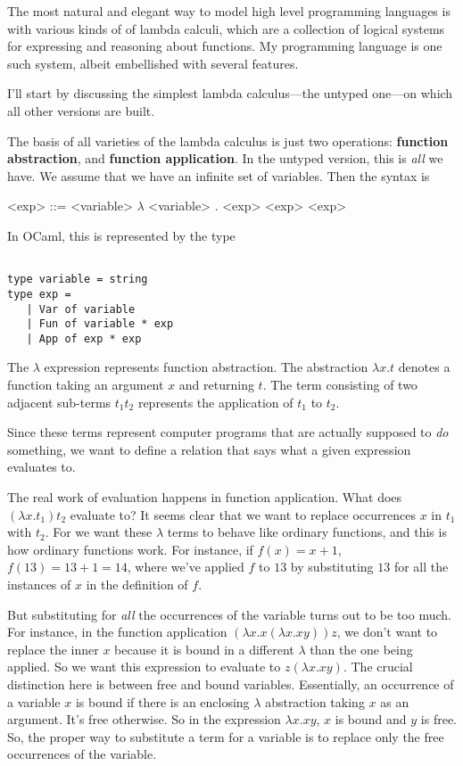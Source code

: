 \message{ !name(report.tex)}\documentclass[pageno]{jpaper}
\begin{document}
{The most natural and elegant way to model high level programming languages is
with various kinds of of lambda calculi, which are a collection of logical systems
for expressing and reasoning about functions.  My programming language is one
such system, albeit embellished with several features.

I'll start by discussing the simplest lambda calculus---the untyped one---on
which all other versions are built.

The basis of all varieties of the lambda calculus is just two operations: \textbf{function abstraction},
and \textbf{function application}.
In the untyped version, this is \textit{all} we have.
We assume that we have an infinite set of variables.
Then the syntax is
\begin{grammar}

<exp> ::= <variable>
\alt $\lambda$ <variable> . <exp>
\alt <exp> <exp>

\end{grammar}

In OCaml, this is represented by the type
\begin{lstlisting}

type variable = string
type exp = 
   | Var of variable
   | Fun of variable * exp
   | App of exp * exp

\end{lstlisting}

The $\lambda$ expression represents function abstraction. The abstraction $\lambda x.t$ denotes
a function taking an argument $x$ and returning $t$. The term consisting of two adjacent sub-terms $t_1 t_2$ represents the application of $t_1$ to $t_2$.

Since these terms represent computer programs that are actually supposed to \textit{do} something, we want to
define a relation that says what a given expression evaluates to.

The real work of evaluation happens in function application. What does $(\lambda x.t_1)t_2$ evaluate to?
It seems clear that we want to replace occurrences $x$ in $t_1$ with $t_2$.
For we want these $\lambda$ terms to behave like ordinary functions, and this is how ordinary functions work.
For instance, if $f(x) = x + 1$, $f(13) = 13 + 1 = 14$, where we've applied $f$ to $13$ by substituting
$13$ for all the instances of $x$ in the definition of $f$.

But substituting for \textit{all} the occurrences of the variable turns out to be too much.
For instance, in the function application $(\lambda x. x (\lambda x. x y)) z$, we don't want to replace the inner
$x$ because it is bound in a different $\lambda$ than the one being applied.
So we want this expression to evaluate to $z (\lambda x. x y)$. The crucial distinction here is between
free and bound variables. Essentially, an occurrence of a variable $x$ is bound if there is an enclosing $\lambda$ abstraction taking $x$ as an argument.  It's free otherwise. So in the expression $\lambda x. x y$,
$x$ is bound and $y$ is free.  So, the proper way to substitute a term for a variable is to replace only
the free occurrences of the variable. 

}
\end{document}
